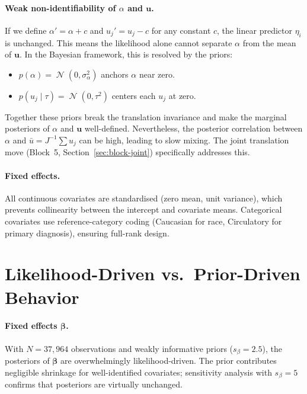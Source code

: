 \documentclass[11pt]{article}
\newcommand{\bbeta}{\bm{\beta}}
\newcommand{\bu}{\bm{u}}
\DeclareMathOperator{\Normal}{\mathcal{N}}
\begin{document}
\paragraph{Weak non-identifiability of $\alpha$ and $\bu$.}
If we define $\alpha' = \alpha + c$ and $u_j' = u_j - c$ for any
constant $c$, the linear predictor $\eta_i$ is unchanged. This means
the likelihood alone cannot separate $\alpha$ from the mean of $\bu$.
In the Bayesian framework, this is resolved by the priors:
\begin{itemize}
  \item $p(\alpha) = \Normal(0,\sigma_\alpha^2)$ anchors $\alpha$ near zero.
  \item $p(u_j\mid\tau) = \Normal(0,\tau^2)$ centers each $u_j$ at zero.
\end{itemize}
Together these priors break the translation invariance and make the
marginal posteriors of $\alpha$ and $\bu$ well-defined. Nevertheless,
the posterior correlation between $\alpha$ and $\bar{u} = J^{-1}\sum u_j$
can be high, leading to slow mixing. The joint translation move
(Block~5, Section~\ref{sec:block-joint}) specifically addresses this.

\paragraph{Fixed effects.}
All continuous covariates are standardised (zero mean, unit variance),
which prevents collinearity between the intercept and covariate means.
Categorical covariates use reference-category coding (Caucasian for race,
Circulatory for primary diagnosis), ensuring full-rank design.

\section{Likelihood-Driven vs.\ Prior-Driven Behavior}
\label{sec:lik-vs-prior}

\paragraph{Fixed effects $\bbeta$.}
With $N = 37{,}964$ observations and weakly informative priors
($s_\beta = 2.5$), the posteriors of $\bbeta$ are overwhelmingly
likelihood-driven. The prior contributes negligible shrinkage for
well-identified covariates; sensitivity analysis with $s_\beta = 5$
confirms that posteriors are virtually unchanged.
\end{document}
